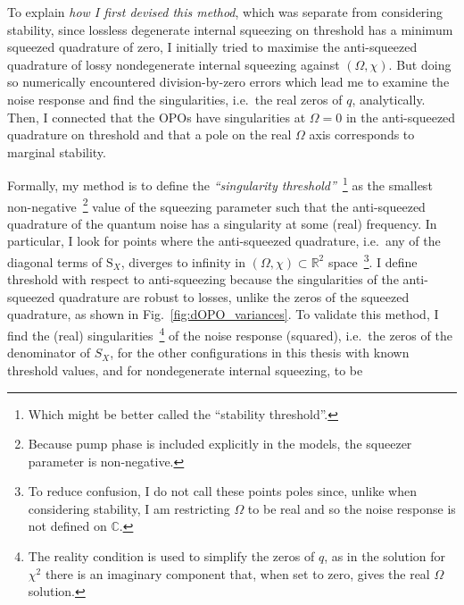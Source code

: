 To explain \emph{how I first devised this method}, which was separate from considering stability, since lossless degenerate internal squeezing on threshold has a minimum squeezed quadrature of zero, I initially tried to maximise the anti-squeezed quadrature of lossy nondegenerate internal squeezing against $(\Omega,\chi)$. But doing so numerically encountered division-by-zero errors which lead me to examine the noise response and find the singularities, i.e.\ the real zeros of $q$, analytically. Then, I connected that the OPOs have singularities at $\Omega=0$ in the anti-squeezed quadrature on threshold and that a pole on the real $\Omega$ axis corresponds to marginal stability.

Formally, my method is to define the \emph{``singularity threshold''}~\footnote{Which might be better called the ``stability threshold''.} as the smallest non-negative~\footnote{Because pump phase is included explicitly in the models, the squeezer parameter is non-negative.} value of the squeezing parameter such that the anti-squeezed quadrature of the quantum noise has a singularity at some (real) frequency. In particular, I look for points where the anti-squeezed quadrature, i.e.\ any of the diagonal terms of $\text{S}_X$, diverges to infinity in $(\Omega,\chi)\subset\mathbb{R}^2$ space~\footnote{To reduce confusion, I do not call these points poles since, unlike when considering stability, I am restricting $\Omega$ to be real and so the noise response is not defined on $\mathbb{C}$.}. %
I define threshold with respect to anti-squeezing because the singularities of the anti-squeezed quadrature are robust to losses, unlike the zeros of the squeezed quadrature, as shown in Fig.~\ref{fig:dOPO_variances}. 
To validate this method, I find the (real) singularities~\footnote{The reality condition is used to simplify the zeros of $q$, as in the solution for $\chi^2$ there is an imaginary component that, when set to zero, gives the real $\Omega$ solution.} of the noise response (squared), i.e.\ the zeros of the denominator of $S_X$, for the other configurations in this thesis with known threshold values, and for nondegenerate internal squeezing, to be
\begingroup
\allowdisplaybreaks
